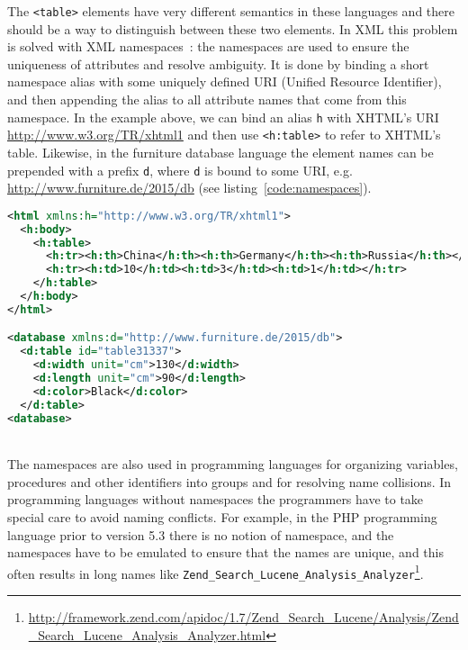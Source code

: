 The \verb|<table>| elements have very different semantics in these languages 
and there should be a way to distinguish between these two elements. 
In XML this problem is solved with XML namespaces~\cite{xmlnamespaces}: 
the namespaces are used to ensure the uniqueness of attributes and resolve ambiguity.
It is done by binding a short namespace alias with some uniquely defined URI 
(Unified Resource Identifier), and then appending the alias to 
all attribute names that come from this namespace. In the example above, 
we can bind an alias \verb|h| with XHTML's URI \url{http://www.w3.org/TR/xhtml1}
and then use \verb|<h:table>| to refer to XHTML's table. Likewise, 
in the furniture database language the element names can be prepended 
with a prefix \verb|d|, where \verb|d| is bound to some URI, e.g. 
\url{http://www.furniture.de/2015/db} (see listing~\ref{code:namespaces}).

\begin{lstlisting}[language=XML,caption={Namespaces in XML},label={code:namespaces}]
<html xmlns:h="http://www.w3.org/TR/xhtml1">
  <h:body>
    <h:table>
      <h:tr><h:th>China</h:th><h:th>Germany</h:th><h:th>Russia</h:th></h:tr>
      <h:tr><h:td>10</h:td><h:td>3</h:td><h:td>1</h:td></h:tr>
    </h:table>
  </h:body>
</html>

<database xmlns:d="http://www.furniture.de/2015/db">
  <d:table id="table31337">
    <d:width unit="cm">130</d:width>
    <d:length unit="cm">90</d:length>
    <d:color>Black</d:color>
  </d:table>
<database>
\end{lstlisting}




\ \\

The namespaces are also used in programming languages for organizing 
variables, procedures and other identifiers into groups and 
for resolving name collisions. In programming languages without 
namespaces the programmers have to take special care to avoid 
naming conflicts. For example, in the PHP programming language 
prior to version 5.3 \cite{mcarthur2008php6} there is no notion of namespace, and 
the namespaces have to be emulated to ensure that the names 
are unique, and this often results in long names like 
\verb|Zend_Search_Lucene_Analysis_Analyzer|\footnote{\url{http://framework.zend.com/apidoc/1.7/Zend_Search_Lucene/Analysis/Zend_Search_Lucene_Analysis_Analyzer.html}}.



